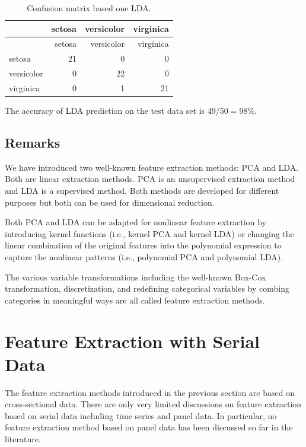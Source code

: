 \documentclass[
]{article}
\begin{document}
\begin{longtable}[]{@{}lrrr@{}}
\caption{Confusion matrix based one LDA.}\tabularnewline
\toprule\noalign{}
& setosa & versicolor & virginica \\
\midrule\noalign{}
\endfirsthead
\toprule\noalign{}
& setosa & versicolor & virginica \\
\midrule\noalign{}
\endhead
\bottomrule\noalign{}
\endlastfoot
setosa & 21 & 0 & 0 \\
versicolor & 0 & 22 & 0 \\
virginica & 0 & 1 & 21 \\
\end{longtable}

The accuracy of LDA prediction on the test data set is \(49/50 = 98\%\).

\hypertarget{remarks}{%
\subsection{Remarks}\label{remarks}}

We have introduced two well-known feature extraction methods: PCA and
LDA. Both are linear extraction methods. PCA is an unsupervised
extraction method and LDA is a supervised method. Both methods are
developed for different purposes but both can be used for dimensional
reduction.

Both PCA and LDA can be adapted for nonlinear feature extraction by
introducing kernel functions (i.e., kernel PCA and kernel LDA) or
changing the linear combination of the original features into the
polynomial expression to capture the nonlinear patterns (i.e.,
polynomial PCA and polynomial LDA).

The various variable transformations including the well-known Box-Cox
transformation, discretization, and redefining categorical variables by
combing categories in meaningful ways are all called feature extraction
methods.

\hypertarget{feature-extraction-with-serial-data}{%
\section{Feature Extraction with Serial
Data}\label{feature-extraction-with-serial-data}}

The feature extraction methods introduced in the previous section are
based on cross-sectional data. There are only very limited discussions
on feature extraction based on serial data including time series and
panel data. In particular, no feature extraction method based on panel
data has been discussed so far in the literature.
\end{document}
